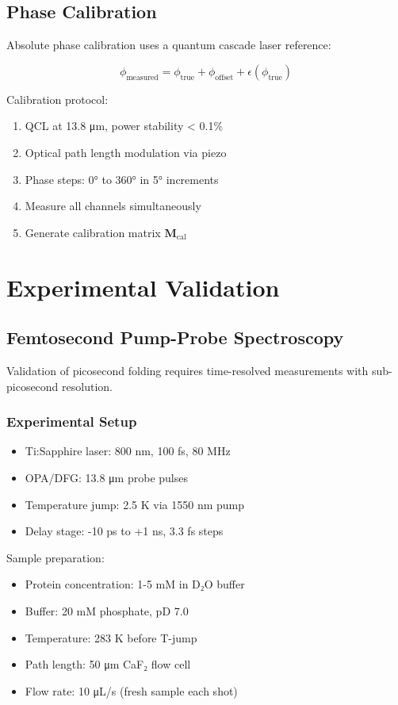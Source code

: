 \documentclass[12pt,twocolumn]{article}
\begin{document}
\subsection{Phase Calibration}

Absolute phase calibration uses a quantum cascade laser reference:

\begin{equation}
\phi_{\text{measured}} = \phi_{\text{true}} + \phi_{\text{offset}} + \epsilon(\phi_{\text{true}})
\end{equation}

Calibration protocol:
\begin{enumerate}
\item QCL at 13.8 μm, power stability < 0.1\%
\item Optical path length modulation via piezo
\item Phase steps: 0° to 360° in 5° increments
\item Measure all channels simultaneously
\item Generate calibration matrix $\mathbf{M}_{\text{cal}}$
\end{enumerate}

\section{Experimental Validation}

\subsection{Femtosecond Pump-Probe Spectroscopy}

Validation of picosecond folding requires time-resolved measurements with sub-picosecond resolution.

\subsubsection{Experimental Setup}

\begin{itemize}
\item Ti:Sapphire laser: 800 nm, 100 fs, 80 MHz
\item OPA/DFG: 13.8 μm probe pulses
\item Temperature jump: 2.5 K via 1550 nm pump
\item Delay stage: -10 ps to +1 ns, 3.3 fs steps
\end{itemize}

Sample preparation:
\begin{itemize}
\item Protein concentration: 1-5 mM in D₂O buffer
\item Buffer: 20 mM phosphate, pD 7.0
\item Temperature: 283 K before T-jump
\item Path length: 50 μm CaF₂ flow cell
\item Flow rate: 10 μL/s (fresh sample each shot)
\end{itemize}
\end{document}
